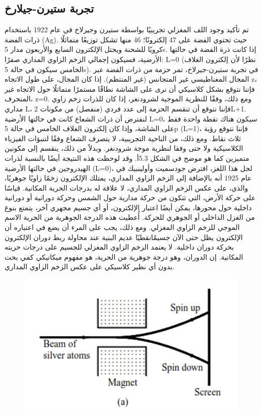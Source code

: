 \subsection{تجربة ستيرن-جيلارخ}
تم تأكيد وجود اللف المغزلي تجريبيًا بواسطة ستيرن وجيرلاخ في عام 1922 باستخدام ذرات الفضة (Ag). حيث تحتوي الفضة على 47 إلكترونًا؛ 46 منها تشكل توزيعًا متماثلًا كرويًا للشحنة ويحتل الإلكترون السابع والأربعون مدار 5s. إذا كانت ذرة الفضة في حالتها الأرضية، فسيكون إجمالي الزخم الزاوي المداري صفرًا: L=0 (نظرًا لأن إلكترون الغلاف الخامس سيكون في حالة 5s). في تجربة ستيرن-جيرلاخ، تمر حزمة من ذرات الفضة عبر المجال المغناطيسي غير المتجانس (غير المنتظم). إذا كان المجال، على طول الاتجاه z، فإننا نتوقع بشكل كلاسيكي أن نرى على الشاشة نطاقًا مستمرًا متماثلًا حول الاتجاه غير المنحرف، z=0. ومع ذلك، وفقًا للنظرية الموجية لشرودنغر، إذا كان للذرات زخم زاوي مداري L، فإننا نتوقع أن تنقسم الحزمة إلى عدد فردي (منفصل) من مكونات 2L+1. لنفترض أن ذرات الشعاع كانت في حالتها الأرضية L=0، سيكون هناك نقطة واحدة فقط على الشاشة، وإذا كان إلكترون الغلاف الخامس في حالة 5p (L=1)، فإننا نتوقع رؤية ثلاث نقاط. ومع ذلك، من الناحية التجريبية، لا يتصرف الشعاع وفقًا لتنبؤات الفيزياء الكلاسيكية ولا حتى وفقا لنظرية موجة شرودنغر. وبدلاً من ذلك، ينقسم إلى مكونين متميزين كما 
هو موضح في الشكل 5.3أ. وقد لوحظت هذه النتيجة أيضًا بالنسبة لذرات الهيدروجين في حالتها الأرضية (L=0)، لحل هذا اللغز، افترض جودسميت وأولينبيك في عام 1925 أنه بالإضافة إلى الزخم الزاوي المداري، يمتلك الإلكترون زخمًا زاويًا جوهريًا، والذي، على عكس الزخم الزاوي المداري، لا علاقة له بدرجات الحرية المكانية. قياسًا على حركة الأرض، التي تتكون من حركة مدارية حول الشمس وحركة دورانية أو دورانية داخلية حول محورها، يمكن أيضًا اعتبار الإلكترون، أو أي جسيم مجهري آخر، يتمتع بنوع من الغزل الداخلي أو الجوهري للحركة. أُعطيت هذه الدرجة الجوهرية من الحرية الاسم الموجي للزخم الزاوي المغزلي. ومع ذلك، يجب على المرء أن يضع في اعتباره أن الإلكترون يظل حتى الآن جسيمًانقطيًا عديم البنية  عند محاولة ربط دوران الإلكترون بحركة دوران داخلية. لا يعتمد الزخم الزاوي المغزلي للجسيم على درجات حريته المكانية. إن الدوران، وهو درجة جوهرية من الحرية، هو مفهوم ميكانيكي كمي بحت بدون أي نظير كلاسيكي على عكس الزخم الزاوي المداري.
\begin{figure}[h]
	\centering
	\includegraphics[width=0.7\linewidth, height=0.23\textheight]{"Fig/Fig_III/Ag atome"}
	\caption{}
	\label{fig:ag-atome}
\end{figure}


